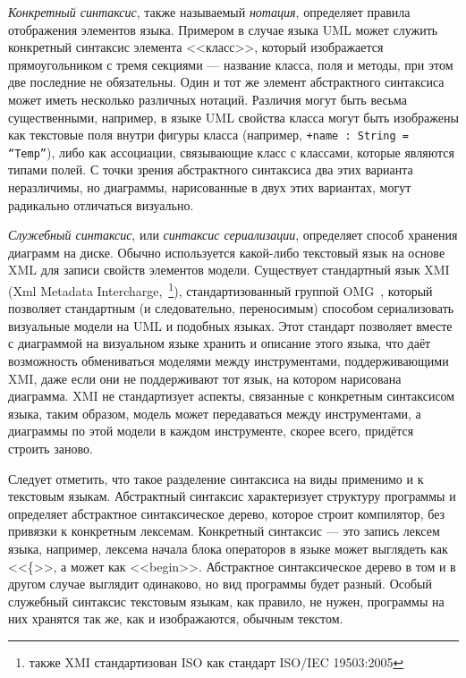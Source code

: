 \textit{Конкретный синтаксис}, также называемый \textit{нотация}, определяет правила отображения 
элементов языка. Примером в случае языка \ac{UML} может служить конкретный синтаксис 
элемента <<класс>>, который изображается прямоугольником с тремя секциями --- 
название класса, поля и методы, при этом две последние не обязательны. Один и 
тот же элемент абстрактного синтаксиса может иметь несколько различных нотаций. 
Различия могут быть весьма существенными, например, в языке \ac{UML} свойства класса 
могут быть изображены как текстовые поля внутри фигуры класса (например, 
\verb|+name : String = “Temp”|), либо как ассоциации, связывающие класс с 
классами, которые являются типами полей. С точки зрения абстрактного синтаксиса 
два этих варианта неразличимы, но диаграммы, нарисованные в двух этих вариантах, 
могут радикально отличаться визуально.

\textit{Служебный синтаксис}, или \textit{синтаксис сериализации}, определяет способ хранения 
диаграмм на диске. Обычно используется какой-либо текстовый язык на основе \ac{XML} 
для записи свойств элементов модели. Существует стандартный язык XMI 
(Xml Metadata Intercharge,~\cite{xmi}\footnote{также XMI стандартизован ISO как стандарт ISO/IEC 19503:2005}), 
стандартизованный группой OMG~\cite{omg}, который позволяет стандартным (и следовательно, переносимым) 
способом сериализовать визуальные модели на \ac{UML} и подобных языках. Этот стандарт позволяет 
вместе с диаграммой на визуальном языке хранить и описание этого языка, что даёт возможность 
обмениваться моделями между инструментами, поддерживающими XMI, даже если они 
не поддерживают тот язык, на котором нарисована диаграмма. 
XMI не стандартизует аспекты, связанные с конкретным синтаксисом языка, таким образом, модель может 
передаваться между инструментами, а диаграммы по этой модели в каждом 
инструменте, скорее всего, придётся строить заново.

Следует отметить, что такое разделение синтаксиса на виды применимо и к 
текстовым языкам. Абстрактный синтаксис характеризует структуру программы и 
определяет абстрактное синтаксическое дерево, которое строит компилятор, 
без привязки к конкретным лексемам. Конкретный синтаксис --- это запись лексем 
языка, например, лексема начала блока операторов в языке может выглядеть как 
<<\{>>, а может как <<begin>>. Абстрактное синтаксическое дерево в том и в 
другом случае выглядит одинаково, но вид программы будет разный. Особый 
служебный синтаксис текстовым языкам, как правило, не нужен, программы на них 
хранятся так же, как и изображаются, обычным текстом.

